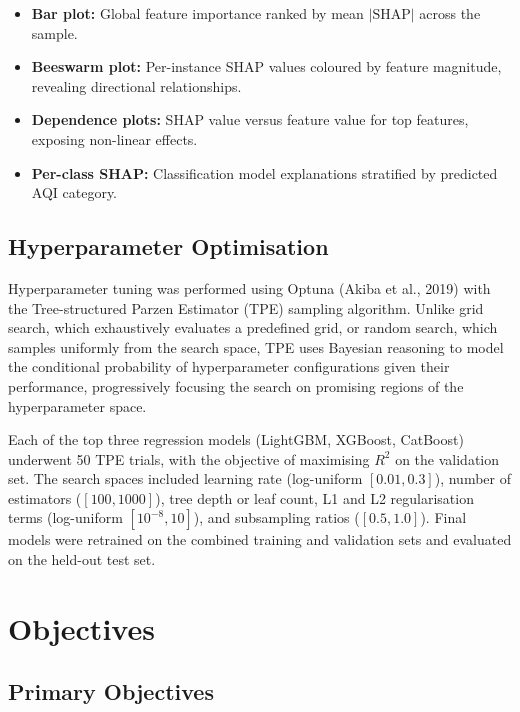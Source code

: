 \documentclass[12pt,a4paper]{report}
\begin{document}
\begin{itemize}
    \item \textbf{Bar plot:} Global feature importance ranked by mean $|\text{SHAP}|$ across the sample.
    \item \textbf{Beeswarm plot:} Per-instance SHAP values coloured by feature magnitude, revealing directional relationships.
    \item \textbf{Dependence plots:} SHAP value versus feature value for top features, exposing non-linear effects.
    \item \textbf{Per-class SHAP:} Classification model explanations stratified by predicted AQI category.
\end{itemize}

\subsection{Hyperparameter Optimisation}

Hyperparameter tuning was performed using Optuna (Akiba et al., 2019) with the Tree-structured Parzen Estimator (TPE) sampling algorithm. Unlike grid search, which exhaustively evaluates a predefined grid, or random search, which samples uniformly from the search space, TPE uses Bayesian reasoning to model the conditional probability of hyperparameter configurations given their performance, progressively focusing the search on promising regions of the hyperparameter space.

Each of the top three regression models (LightGBM, XGBoost, CatBoost) underwent 50 TPE trials, with the objective of maximising $R^2$ on the validation set. The search spaces included learning rate (log-uniform $[0.01, 0.3]$), number of estimators ($[100, 1000]$), tree depth or leaf count, L1 and L2 regularisation terms (log-uniform $[10^{-8}, 10]$), and subsampling ratios ($[0.5, 1.0]$). Final models were retrained on the combined training and validation sets and evaluated on the held-out test set.

\section{Objectives}\label{idx:s22}

\subsection{Primary Objectives}
\end{document}
